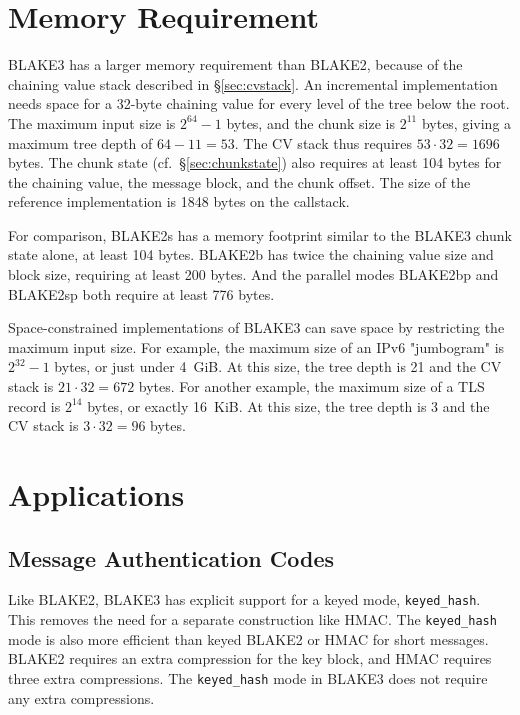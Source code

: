 \documentclass[11pt,notitlepage,a4paper]{article}
\begin{document}
\section{Memory Requirement}\label{sec:memory}

BLAKE3 has a larger memory requirement than BLAKE2, because of the chaining
value stack described in \S\ref{sec:cvstack}. An incremental implementation
needs space for a 32-byte chaining value for every level of the tree below the
root. The maximum input size is $2^{64}-1$ bytes, and the chunk size is
$2^{11}$ bytes, giving a maximum tree depth of $64 - 11 = 53$. The CV stack
thus requires $53 \cdot 32 = 1696$ bytes. The chunk state
(cf.~\S\ref{sec:chunkstate}) also requires at least 104 bytes for the chaining
value, the message block, and the chunk offset. The size of the reference
implementation is 1848 bytes on the callstack.

For comparison, BLAKE2s has a memory footprint similar to the BLAKE3 chunk
state alone, at least 104 bytes. BLAKE2b has twice the chaining value size and
block size, requiring at least 200 bytes. And the parallel modes BLAKE2bp and
BLAKE2sp both require at least 776 bytes.

Space-constrained implementations of BLAKE3 can save space by restricting the
maximum input size. For example, the maximum size of an IPv6 "jumbogram" is
$2^{32}-1$ bytes, or just under 4~GiB. At this size, the tree depth is 21 and
the CV stack is $21 \cdot 32 = 672$ bytes. For another example, the maximum
size of a TLS record is $2^{14}$ bytes, or exactly 16~KiB. At this size, the
tree depth is 3 and the CV stack is $3 \cdot 32 = 96$ bytes.

\section{Applications}\label{sec:applications}

\subsection{Message Authentication Codes}\label{sec:mac}

Like BLAKE2, BLAKE3 has explicit support for a keyed mode,
\texttt{keyed\_hash}. This removes the need for a separate construction like
HMAC. The \texttt{keyed\_hash} mode is also more efficient than keyed BLAKE2 or
HMAC for short messages. BLAKE2 requires an extra compression for the key
block, and HMAC requires three extra compressions. The \texttt{keyed\_hash}
mode in BLAKE3 does not require any extra compressions.
\end{document}
